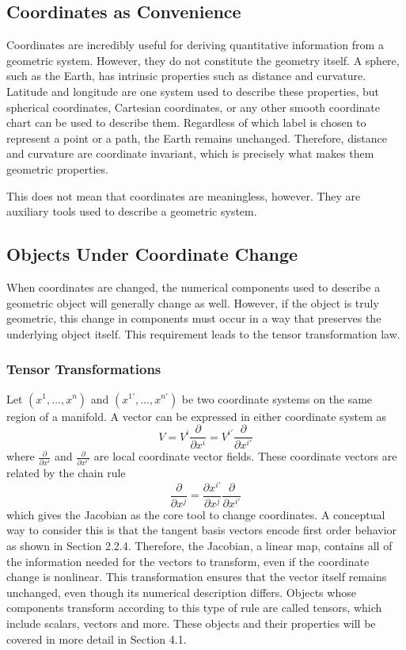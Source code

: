 \documentclass[12pt]{article}
\newcommand{\p}{\partial}
\begin{document}
\subsection{Coordinates as Convenience}

Coordinates are incredibly useful for deriving quantitative information from a geometric system. However, they do not constitute the geometry itself. A sphere, such as the Earth, has intrinsic properties such as distance and curvature. Latitude and longitude are one system used to describe these properties, but spherical coordinates, Cartesian coordinates, or any other smooth coordinate chart can be used to describe them. Regardless of which label is chosen to represent a point or a path, the Earth remains unchanged. Therefore, distance and curvature are coordinate invariant, which is precisely what makes them geometric properties.

This does not mean that coordinates are meaningless, however. They are auxiliary tools used to describe a geometric system.

\subsection{Objects Under Coordinate Change}

When coordinates are changed, the numerical components used to describe a geometric object will generally change as well. However, if the object is truly geometric, this change in components must occur in a way that preserves the underlying object itself. This requirement leads to the tensor transformation law.

\subsubsection{Tensor Transformations}

Let $(x^1, \dots, x^n)$ and $(x^{1'}, \dots, x^{n'})$ be two coordinate systems on the same region of a manifold. A vector can be expressed in either coordinate system as
\[
V = V^{i}\frac{\p}{\p x^i} = V^{i'}\frac{\p}{\p x^{i'}}
\]
where $\frac{\p}{\p x^i}$ and $\frac{\p}{\p x^{i'}}$ are local coordinate vector fields. These coordinate vectors are related by the chain rule
\[
\frac{\p}{\p x^j} = \frac{\p x^{i'}}{\p x^j}\frac{\p}{\p x^{i'}}
\]
which gives the Jacobian as the core tool to change coordinates. A conceptual way to consider this is that the tangent basis vectors encode first order behavior as shown in Section 2.2.4. Therefore, the Jacobian, a linear map, contains all of the information needed for the vectors to transform, even if the coordinate change is nonlinear. This transformation ensures that the vector itself remains unchanged, even though its numerical description differs. Objects whose components transform according to this type of rule are called tensors, which include scalars, vectors and more. These objects and their properties will be covered in more detail in Section 4.1.
\end{document}
